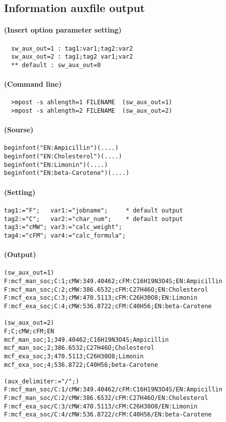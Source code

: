 \documentclass[a4paper]{article}
\begin{document}
\subsection{Information auxfile output}
\paragraph{(Insert option parameter setting)}
\begin{verbatim}
  sw_aux_out=1 : tag1:var1;tag2:var2
  sw_aux_out=2 : tag1;tag2 var1;var2
  ** default : sw_aux_out=0
\end{verbatim}
\paragraph{(Command line)}
\begin{verbatim}
  >mpost -s ahlength=1 FILENAME  (sw_aux_out=1)
  >mpost -s ahlength=2 FILENAME  (sw_aux_out=2)
\end{verbatim}
\paragraph{(Sourse)}
\begin{verbatim}
beginfont("EN:Ampicillin")(....)
beginfont("EN:Cholesterol")(....)
beginfont("EN:Limonin")(....)
beginfont("EN:beta-Carotene")(....)
\end{verbatim}
\paragraph{(Setting)}
\begin{verbatim}
tag1:="F";   var1:="jobname";     * default output
tag2:="C";   var2:="char_num";    * default output
tag3:="cMW"; var3:="calc_weight";
tag4:="cFM"; var4:="calc_formula";
\end{verbatim}
\paragraph{(Output)}
\begin{verbatim}
(sw_aux_out=1)
F:mcf_man_soc;C:1;cMW:349.40462;cFM:C16H19N3O4S;EN:Ampicillin
F:mcf_man_soc;C:2;cMW:386.6532;cFM:C27H46O;EN:Cholesterol
F:mcf_exa_soc;C:3;cMW:470.5113;cFM:C26H30O8;EN:Limonin
F:mcf_exa_soc;C:4;cMW:536.8722;cFM:C40H56;EN:beta-Carotene

(sw_aux_out=2)
F;C;cMW;cFM;EN
mcf_man_soc;1;349.40462;C16H19N3O4S;Ampicillin
mcf_man_soc;2;386.6532;C27H46O;Cholesterol
mcf_exa_soc;3;470.5113;C26H30O8;Limonin
mcf_exa_soc;4;536.8722;C40H56;beta-Carotene

(aux_delimiter:="/";)
F:mcf_man_soc/C:1/cMW:349.40462/cFM:C16H19N3O4S/EN:Ampicillin
F:mcf_man_soc/C:2/cMW:386.6532/cFM:C27H46O/EN:Cholesterol
F:mcf_exa_soc/C:3/cMW:470.5113/cFM:C26H30O8/EN:Limonin
F:mcf_exa_soc/C:4/cMW:536.8722/cFM:C40H56/EN:beta-Carotene
\end{verbatim}
\end{document}
